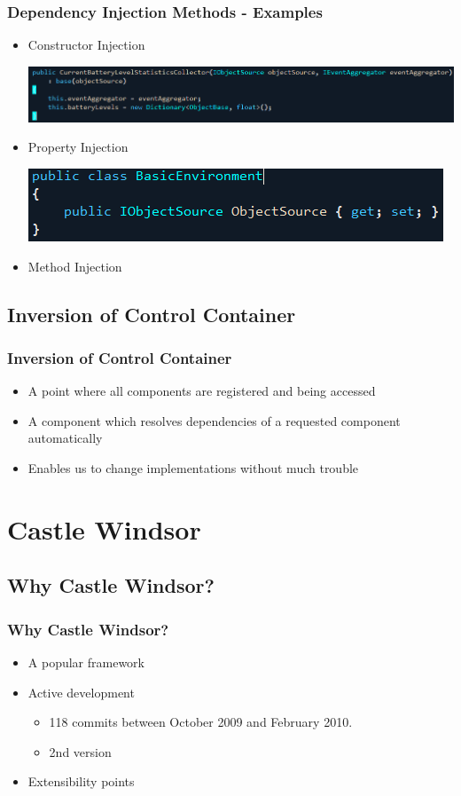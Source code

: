 \documentclass[turkish]{beamer}
\begin{document}
		{
			\frametitle{Dependency Injection Methods - Examples}
		  \begin{itemize}
		  	\item<1->Constructor Injection
		  		\begin{center}
						\includegraphics[scale=0.40]{images/constructorinjection.png}
					\end{center}
		  	\item<2->Property Injection
		  		\begin{center}
		  			\includegraphics[scale=0.40]{images/propertyinjection.png}
		  		\end{center}
		  	\item<3->Method Injection
		  \end{itemize}
		}
	\subsection{Inversion of Control Container}
	  \frame
		{
			\frametitle{Inversion of Control Container}
			\begin{itemize}
				\item<1->A point where all components are registered and being accessed
				\item<2->A component which resolves dependencies of a requested component automatically
				\item<3->Enables us to change implementations without much trouble
			\end{itemize}
		}
\section{Castle Windsor}
	\subsection{Why Castle Windsor?}
			\frame
			{
				\frametitle{Why Castle Windsor?}
			  \begin{itemize}
			  	\item<1->A popular framework
			  	\item<2->Active development
			  	\begin{itemize}
			  	  \item<3->118 commits between October 2009 and February 2010.   
			  		\item<4->2nd version
			  	\end{itemize}
			  	\item<5->Extensibility points
			  \end{itemize}
			}
\end{document}
